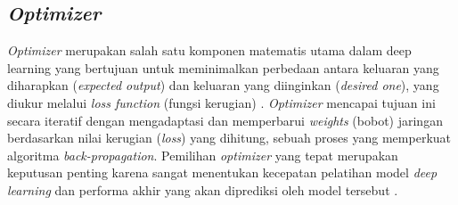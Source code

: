 \subsection{\textit{Optimizer}} \label{II.TeoriOptimizer}
\textit{Optimizer} merupakan salah satu komponen matematis utama dalam deep learning yang bertujuan untuk meminimalkan perbedaan antara keluaran yang diharapkan (\textit{expected output}) dan keluaran yang diinginkan (\textit{desired one}), yang diukur melalui \textit{loss function} (fungsi kerugian) \cite{optimizer}. \textit{Optimizer} mencapai tujuan ini secara iteratif dengan mengadaptasi dan memperbarui \textit{weights} (bobot) jaringan berdasarkan nilai kerugian (\textit{loss}) yang dihitung, sebuah proses yang memperkuat algoritma \textit{back-propagation}. Pemilihan \textit{optimizer} yang tepat merupakan keputusan penting karena sangat menentukan kecepatan pelatihan model \textit{deep learning} dan performa akhir yang akan diprediksi oleh model tersebut \cite{optimizer}. \par


